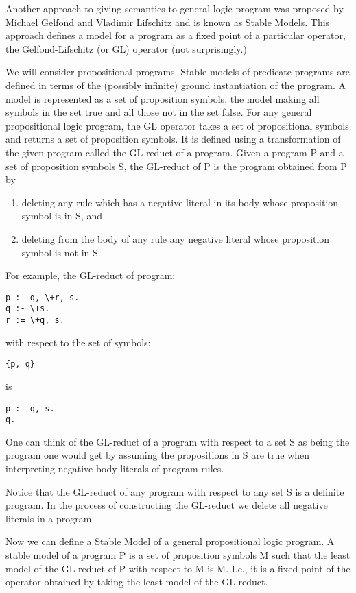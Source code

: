 Another approach to giving semantics to general logic program was
proposed by Michael Gelfond and Vladimir Lifschitz \cite{hjk} and is
known as Stable Models.  This approach defines a model for a program
as a fixed point of a particular operator, the Gelfond-Lifschitz (or
GL) operator (not surprisingly.)

We will consider propositional programs.  Stable models of predicate
programs are defined in terms of the (possibly infinite) ground
instantiation of the program.  A model is represented as a set of
proposition symbols, the model making all symbols in the set true and
all those not in the set false.  For any general propositional logic
program, the GL operator takes a set of propositional symbols and
returns a set of proposition symbols.  It is defined using a
transformation of the given program called the GL-reduct of a program.
Given a program P and a set of proposition symbols S, the GL-reduct of
P is the program obtained from P by 
\begin{enumerate}
\item
deleting any rule which has a negative literal in its body whose
proposition symbol is in S, and
\item
deleting from the body of any rule any negative literal whose
proposition symbol is not in S.
\end{enumerate}
For example, the GL-reduct of program:
\begin{verbatim}
p :- q, \+r, s.
q :- \+s.
r := \+q, s.
\end{verbatim}
with respect to the set of symbols:
\begin{verbatim}
{p, q}
\end{verbatim}
is
\begin{verbatim}
p :- q, s.
q.
\end{verbatim}
One can think of the GL-reduct of a program with respect to a set S as
being the program one would get by assuming the propositions in S are
true when interpreting negative body literals of program rules.

Notice that the GL-reduct of any program with respect to any set S is
a definite program.  In the process of constructing the GL-reduct we
delete all negative literals in a program.

Now we can define a Stable Model of a general propositional logic
program.  A stable model of a program P is a set of proposition
symbols M such that the least model of the GL-reduct of P with respect
to M is M.  I.e., it is a fixed point of the operator obtained by
taking the least model of the GL-reduct.

